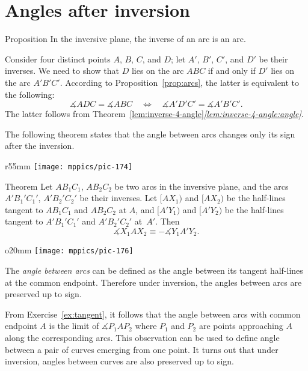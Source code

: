 \section*{Angles after inversion}

\begin{thm}{Proposition}
In the inversive plane, the inverse of an arc is an arc.

\end{thm}

Consider four distinct points $A$, $B$, $C$, and $D$; 
let $A'$, $B'$, $C'$, and $D'$  be their inverses.
We need to show that $D$ lies on the arc $ABC$ if and only if $D'$ lies on the arc $A'B'C'$.
According to Proposition~\ref{prop:arcs},
the latter is equivalent to the following:
$$\measuredangle ADC= \measuredangle ABC
\quad
\iff
\quad  
\measuredangle A'D'C'= \measuredangle A'B'C'.$$
The latter follows from Theorem~\ref{lem:inverse-4-angle}\textit{\ref{lem:inverse-4-angle:angle}}.
\qeds

The following theorem states that the angle between arcs changes only its sign after the inversion.

{

\begin{wrapfigure}{r}{55mm}
\vskip-6mm
\centering
\texttt{[image: mppics/pic-174]}
\end{wrapfigure}

\begin{thm}{Theorem}\label{thm:angle-inversion}
Let $AB_1C_1$, $AB_2C_2$ be two arcs in the inversive plane,
and the arcs $A'B_1'C_1'$, $A'B_2'C_2'$ be their inverses.
Let $[AX_1)$ and $[AX_2)$ be the half-lines tangent to $AB_1C_1$ and  $AB_2C_2$ at $A$,
and
$[A'Y_1)$ and $[A'Y_2)$ be the half-lines tangent to $A'B_1'C_1'$ and  $A'B_2'C_2'$ at~$A'$.
Then
$$\measuredangle X_1AX_2\equiv-\measuredangle Y_1A'Y_2.$$

\end{thm}

}

{

\begin{wrapfigure}[6]{o}{20mm}
\vskip-6mm
\centering
\texttt{[image: mppics/pic-176]}
\end{wrapfigure}

The \emph{angle between arcs} can be defined as the angle between its tangent half-lines at the common endpoint.
Therefore under inversion, the angles between arcs are preserved up to sign.


From Exercise~\ref{ex:tangent}, it follows that the angle between arcs with common endpoint $A$ is the limit of $\measuredangle P_1AP_2$ where $P_1$ and $P_2$ are points approaching $A$ along the corresponding arcs. 
This observation can be used to define angle between a pair of curves emerging from one point.
It turns out that under inversion, angles between curves are also preserved up to sign.

}

